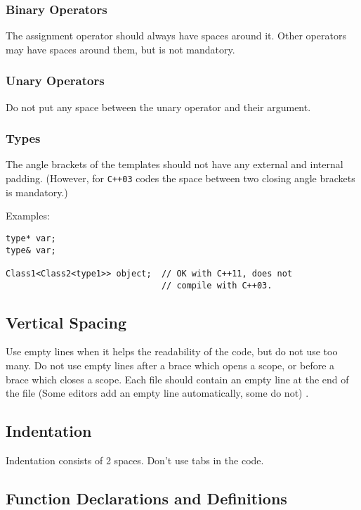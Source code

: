 \documentclass[a4paper]{article}
\begin{document}
\subsubsection{Binary Operators}

The assignment operator should always have spaces around it. Other operators may have spaces around them, but is not mandatory.

\subsubsection{Unary Operators}

Do not put any space between the unary operator and their argument.

\subsubsection{Types}

The angle brackets of the templates should not have any external and internal padding.
(However, for \texttt{C++03} codes the space between two closing angle brackets is mandatory.)

Examples:
\begin{lstlisting}
type* var;
type& var;

Class1<Class2<type1>> object;  // OK with C++11, does not
                               // compile with C++03.
\end{lstlisting}

\subsection{Vertical Spacing}

Use empty lines when it helps the readability of the code, but do not use too many.
Do not use empty lines after a brace which opens a scope,
or before a brace which closes a scope.
Each file should contain an empty line at the end of the file (Some editors add an empty line automatically, some do not) . 

\subsection{Indentation}

Indentation consists of 2 spaces. Don't use tabs in the code.

\subsection{Function Declarations and Definitions}
\end{document}
